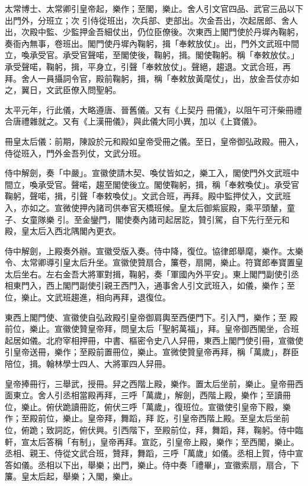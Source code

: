 \begin{pinyinscope}
 太常博士、太常卿引皇帝起，樂作；至閣，樂止。舍人引文官四品、武官三品以下出門外，分班立；次
 引侍從班出，次兵部、吏部出。次金吾出，次起居郎、舍人出，次殿中監、少監押金吾細仗出，仍位臣僚後。次東西上閣門使於丹墀內鞠躬，奏衙內無事，卷班出。閣門使丹墀內鞠躬，揖「奉敕放仗」。出，門外文武班中間立，喚承受官。承受官聲喏，至閣使後，鞠躬，揖。閣使鞠躬。稱「奉敕放仗。」承受聲喏，鞠躬，揖，平身立，引聲「奉敕放仗」。聲絕，趨退。文武合班，再拜。舍人一員攝詞令官，殿前鞠躬，揖，稱「奉敕放黃麾仗」，出，放金吾仗亦如之，翼日，文武臣僚入問聖躬。



 太平元年，行此儀，大略遵唐、晉舊儀。又有《上契丹
 冊儀》，以阻午可汗柴冊禮合唐禮雜就之。又有《上漢冊儀》，與此儀大同小異，加以《上寶儀》。



 冊皇太后儀：前期，陳設於元和殿如皇帝受冊之儀。至日，皇帝御弘政殿。冊入，侍從班入，門外金吾列仗，文武分班。



 侍中解劍，奏「中嚴」。宣徽使請木契、喚仗皆如之，樂工入，閣使門外文武班中間立，喚承受官。聲喏，趨至閣使後立。閣使鞠躬，揖，稱「奉敕喚仗」。承受官鞠躬，聲喏，揖，引聲「奉敕喚仗」。文武合班，再拜。殿中監押仗入，文武班入，亦如之。宣微使押內諸司供奉官天橋班候。皇太后御紫宸殿，乘平頭輦，童子、女童隊樂
 引。至金鑾門，閣使奏內諸司起居訖，贊引駕，自下先行至元和殿，皇太后入西北隅閣內更衣。



 侍中解劍，上殿奏外辦。宣徽受版入奏。侍中降，復位。協律郎舉麾，樂作。太樂令、太常卿導引皇太后升坐。宣徽使贊扇合，簾卷，扇開，樂止。符寶郎奉寶置皇太后坐右。左右金吾大將軍對揖，鞠躬，奏「軍國內外平安」。東上閣門副使引丞相東門入，西上閣門副使引親王西門入，通事舍人引文武班入，如儀，樂作；至位，樂止。文武班趨進，相向再拜，退復位。



 東西上閣門使、宣徽使自弘政殿引皇帝御肩輿至西便門下。引入門，樂作；至
 殿前位，樂止。宣徽使贊皇帝拜，問皇太后「聖躬萬福」，拜。皇帝御西閣坐，合班起居如儀。北府宰相押冊，中書、樞密令史八人舁冊，東西上閣門使引冊，宣徽使引皇帝送冊，樂作；至殿前置冊位，樂止。宣微使贊皇帝再拜，稱「萬歲」，群臣陪位，揖。翰林學士四人、大將軍四人舁冊。



 皇帝捧冊行，三舉武，授冊。舁之西階上殿，樂作。置太后坐前，樂止。皇帝冊西面東立。舍人引丞相當殿再拜，三呼「萬歲」，解劍，西階上殿，樂作；至讀冊位，樂止。俯伏跪讀冊訖，俯伏三呼「萬歲」，復班位。宣徽使引皇帝下殿，樂作；至殿前位，樂止。皇帝拜，舞蹈，拜
 訖，引皇帝西階上殿。至皇太后坐前位，俯跪；致詞訖，俯伏興。引西階下，至殿前位，拜，舞蹈，拜，鞠躬。侍中臨軒，宣太后答稱「有制」，皇帝再拜。宣訖，引皇帝上殿，樂作；至西閣，樂止。丞相、親王、侍從文武合班，贊拜，舞蹈，三呼「萬歲」如儀。丞相上賀，侍中宣答如儀。丞相以下出，舉樂；出門，樂止。侍中奏「禮畢」，宣徽索扇，扇合，下簾。皇太后起，舉樂；入閣，樂止。




\end{pinyinscope}
